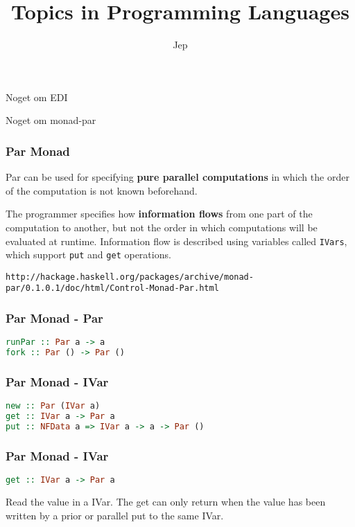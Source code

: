 \documentclass[12pt, danish]{beamer}
\title{Topics in Programming Languages}
\author{Jep}
\begin{document}
\begin{frame}
\maketitle
\end{frame}

\begin{frame}
Noget\pause{} om\pause{} EDI
\end{frame}

\begin{frame}
Noget\pause{} om\pause{} monad-par
\end{frame}

\begin{frame}
  \frametitle{Par Monad}
  Par can be used for specifying \textbf{pure parallel computations} in which the order of the computation is not known beforehand. \newline
  
  The programmer specifies how \textbf{information flows} from one part of the computation to another, but not the order in which computations will be evaluated at runtime. Information flow is described using variables called \texttt{IVars}, which support \texttt{put} and \texttt{get} operations. \newline 
  
\texttt{http://hackage.haskell.org/packages/archive/monad-par/0.1.0.1/doc/html/Control-Monad-Par.html}
\end{frame}

\begin{frame}[fragile]
  \frametitle{Par Monad - Par}
  \begin{lstlisting}[language=Haskell]
runPar :: Par a -> a
fork :: Par () -> Par ()
  \end{lstlisting}
\end{frame}

\begin{frame}[fragile]
  \frametitle{Par Monad - IVar}
  \begin{lstlisting}[language=Haskell]
new :: Par (IVar a)
get :: IVar a -> Par a
put :: NFData a => IVar a -> a -> Par ()
  \end{lstlisting}
\end{frame}

\begin{frame}[fragile]
  \frametitle{Par Monad - IVar}
  \begin{lstlisting}[language=Haskell]
get :: IVar a -> Par a  
  \end{lstlisting}

  Read the value in a IVar. The get can only return when the value 
  has been written by a prior or parallel put to the same IVar.
\end{frame}
\end{document}
